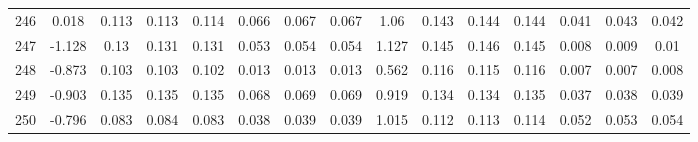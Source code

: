 \begin{table}[H]
{\begin{tabular}{l|c|ccc|ccc|c|ccc|ccc}
			246 & 0.018 & 0.113 & 0.113 & 0.114 & 0.066 & 0.067 & 0.067 & 1.06 & 0.143 & 0.144 & 0.144 & 0.041 & 0.043 & 0.042 \\
			247 & -1.128 & 0.13 & 0.131 & 0.131 & 0.053 & 0.054 & 0.054 & 1.127 & 0.145 & 0.146 & 0.145 & 0.008 & 0.009 & 0.01 \\
			248 & -0.873 & 0.103 & 0.103 & 0.102 & 0.013 & 0.013 & 0.013 & 0.562 & 0.116 & 0.115 & 0.116 & 0.007 & 0.007 & 0.008 \\
			249 & -0.903 & 0.135 & 0.135 & 0.135 & 0.068 & 0.069 & 0.069 & 0.919 & 0.134 & 0.134 & 0.135 & 0.037 & 0.038 & 0.039 \\
			250 & -0.796 & 0.083 & 0.084 & 0.083 & 0.038 & 0.039 & 0.039 & 1.015 & 0.112 & 0.113 & 0.114 & 0.052 & 0.053 & 0.054 \\
	\end{tabular}}
	
\end{table}
\pagebreak

